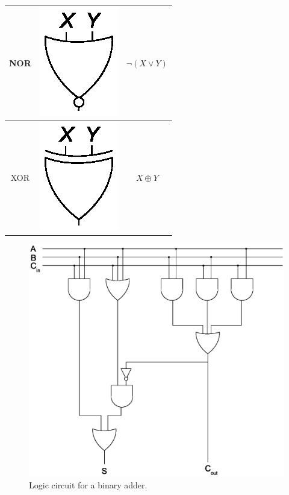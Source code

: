 \documentclass{article}
\begin{document}
\begin{table}
\begin{tabular}{|c|c|c|}
		\hline
		NOR & \includegraphics{nor_gate.eps} & $\lnot(X \lor Y)$\\
		\hline
		XOR & \includegraphics{xor_gate.eps} & $X \oplus Y$\\
		\hline
	\end{tabular}
\end{table}

\begin{figure}
	\includegraphics[width=1\textwidth]{adder.eps}
	\caption{Logic circuit for a binary adder.}\label{adder}
\end{figure}
\end{document}
